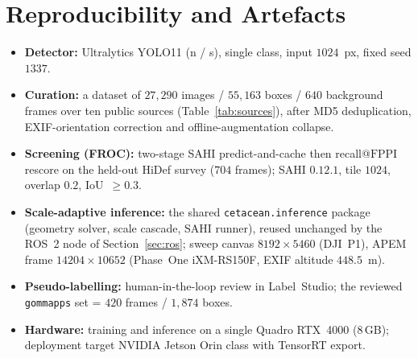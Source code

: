 \documentclass[11pt,a4paper]{article}
\newcommand{\imgsz}{1024}
\newcommand{\fppi}{\text{FPPI}}
\begin{document}
\section{Reproducibility and Artefacts}
\begin{itemize}[itemsep=2pt,topsep=2pt]
  \item \textbf{Detector:} Ultralytics YOLO11 (n / s), single class, input
  $\imgsz$~px, fixed seed $1337$.
  \item \textbf{Curation:} a dataset of $27{,}290$ images / $55{,}163$ boxes /
  $640$ background frames over ten public sources (Table~\ref{tab:sources}),
  after MD5 deduplication, EXIF-orientation correction and offline-augmentation
  collapse.
  \item \textbf{Screening (FROC):} two-stage SAHI predict-and-cache then
  recall@$\fppi$ rescore on the held-out HiDef survey ($704$ frames); SAHI
  $0.12.1$, tile $1024$, overlap $0.2$, IoU~$\ge\!0.3$.
  \item \textbf{Scale-adaptive inference:} the shared \texttt{cetacean.inference}
  package (geometry solver, scale cascade, SAHI runner), reused unchanged by the
  ROS~2 node of Section~\ref{sec:ros}; sweep canvas $8192\times5460$ (DJI~P1),
  APEM frame $14204\times10652$ (Phase~One iXM-RS150F, EXIF altitude $448.5$~m).
  \item \textbf{Pseudo-labelling:} human-in-the-loop review in Label~Studio;
  the reviewed \texttt{gommapps} set = $420$ frames / $1{,}874$ boxes.
  \item \textbf{Hardware:} training and inference on a single Quadro RTX~4000
  ($8$\,GB); deployment target NVIDIA Jetson Orin class with TensorRT export.
\end{itemize}
\end{document}
